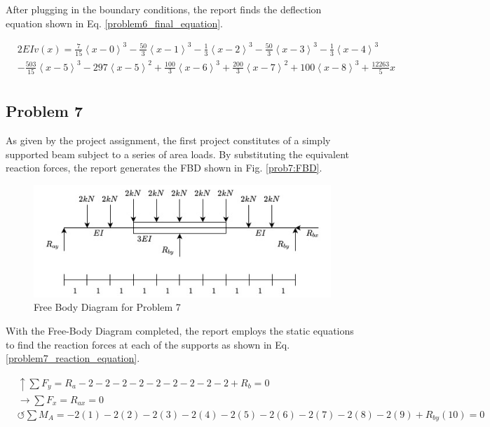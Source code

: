 \documentclass[a4paper]{article}
\begin{document}
After plugging in the boundary conditions, the report finds the deflection equation shown in Eq. \ref{problem6_final_equation}.

\begin{equation}
\begin{split}
  & 2EI v(x) = \frac{7}{15}\left<x-0\right>^3 - \frac{50}{3}\left<x-1\right>^3 -  \frac{1}{3}\left<x-2\right>^3 - \frac{50}{3}\left<x-3\right>^3 - \frac{1}{3}\left<x-4\right>^3 \\
  & - \frac{503}{15}\left<x-5\right>^3 - 297\left<x-5\right>^2 + \frac{100}{3}\left<x-6\right>^3 + \frac{200}{3}\left<x-7\right>^2 + 100\left<x-8\right>^3 + \frac{12263}{5}x\\
\end{split}
\label{problem6_final_equation}
\end{equation}



\subsection{Problem 7}

As given by the project assignment, the first project constitutes of a simply supported beam subject to a series of area loads. By substituting the equivalent reaction forces, the report generates the FBD shown in Fig. \ref{prob7:FBD}.

\begin{figure}[h]
\includegraphics[width=\textwidth]{FBD/FBD_7.jpg}
\caption{Free Body Diagram for Problem 7}
\label{FBD_7}
\end{figure}

With the Free-Body Diagram completed, the report employs the static equations to find the reaction forces at each of the supports as shown in Eq. \ref{problem7_reaction_equation}.

\begin{equation}
\begin{split}
	&\uparrow \sum F_y = R_a - 2 -2 -2 -2 -2 -2 -2 -2 -2 + R_b = 0 \\
 	&\rightarrow \sum F_x = R_{ax} = 0 \\
 	&\circlearrowleft \sum M_A = -2(1) - 2(2) -2(3) - 2(4) -2(5) - 2(6) - 2(7) - 2(8) -2(9) + R_{by}(10) = 0 \\
\end{split}
\label{problem7_reaction_equation}
\end{equation}
\end{document}
